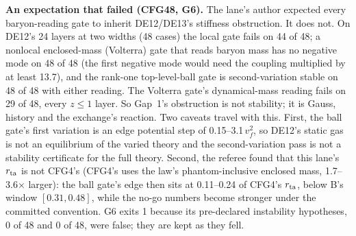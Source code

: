 \documentclass[10pt]{article}
\begin{document}
\textbf{An expectation that failed (CFG48, G6).} The lane's author expected every baryon-reading gate to inherit DE12/DE13's stiffness obstruction. It does not. On DE12's 24 layers at two widths (48 cases) the local gate fails on 44 of 48; a nonlocal enclosed-mass (Volterra) gate that reads baryon mass has no negative mode on 48 of 48 (the first negative mode would need the coupling multiplied by at least 13.7), and the rank-one top-level-ball gate is second-variation stable on 48 of 48 with either reading. The Volterra gate's dynamical-mass reading fails on 29 of 48, every $z\le1$ layer. So Gap~1's obstruction is not stability; it is Gauss, history and the exchange's reaction. Two caveats travel with this. First, the ball gate's first variation is an edge potential step of 0.15--3.1\,$v_f^2$, so DE12's static gas is not an equilibrium of the varied theory and the second-variation pass is not a stability certificate for the full theory. Second, the referee found that this lane's $r_{\rm ta}$ is not CFG4's (CFG4's uses the law's phantom-inclusive enclosed mass, 1.7--3.6$\times$ larger): the ball gate's edge then sits at 0.11--0.24 of CFG4's $r_{\rm ta}$, below B's window $[0.31,0.48]$, while the no-go numbers become stronger under the committed convention. G6 exits 1 because its pre-declared instability hypotheses, 0 of 48 and 0 of 48, were false; they are kept as they fell.
\end{document}
